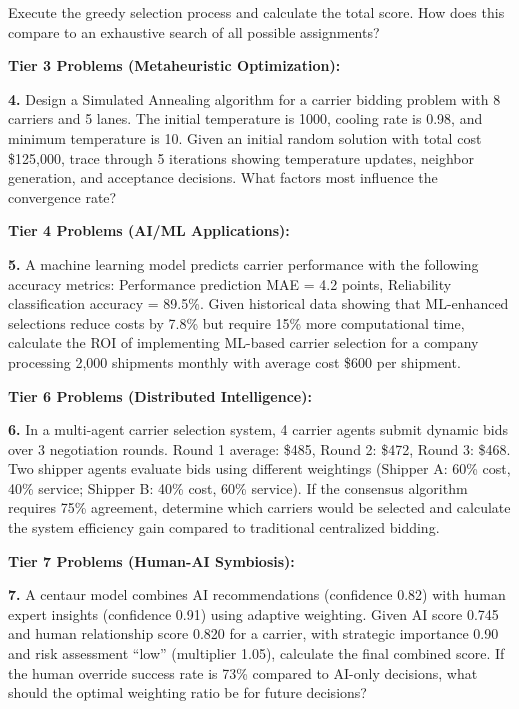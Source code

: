 \documentclass{article}
\begin{document}
Execute the greedy selection process and calculate the total score. How does this compare to an exhaustive search of all possible assignments?

\textbf{Tier 3 Problems (Metaheuristic Optimization):}

\textbf{4.} Design a Simulated Annealing algorithm for a carrier bidding problem with 8 carriers and 5 lanes. The initial temperature is 1000, cooling rate is 0.98, and minimum temperature is 10. Given an initial random solution with total cost \$125,000, trace through 5 iterations showing temperature updates, neighbor generation, and acceptance decisions. What factors most influence the convergence rate?

\textbf{Tier 4 Problems (AI/ML Applications):}

\textbf{5.} A machine learning model predicts carrier performance with the following accuracy metrics: Performance prediction MAE = 4.2 points, Reliability classification accuracy = 89.5\%. Given historical data showing that ML-enhanced selections reduce costs by 7.8\% but require 15\% more computational time, calculate the ROI of implementing ML-based carrier selection for a company processing 2,000 shipments monthly with average cost \$600 per shipment.

\textbf{Tier 6 Problems (Distributed Intelligence):}

\textbf{6.} In a multi-agent carrier selection system, 4 carrier agents submit dynamic bids over 3 negotiation rounds. Round 1 average: \$485, Round 2: \$472, Round 3: \$468. Two shipper agents evaluate bids using different weightings (Shipper A: 60\% cost, 40\% service; Shipper B: 40\% cost, 60\% service). If the consensus algorithm requires 75\% agreement, determine which carriers would be selected and calculate the system efficiency gain compared to traditional centralized bidding.

\textbf{Tier 7 Problems (Human-AI Symbiosis):}

\textbf{7.} A centaur model combines AI recommendations (confidence 0.82) with human expert insights (confidence 0.91) using adaptive weighting. Given AI score 0.745 and human relationship score 0.820 for a carrier, with strategic importance 0.90 and risk assessment ``low'' (multiplier 1.05), calculate the final combined score. If the human override success rate is 73\% compared to AI-only decisions, what should the optimal weighting ratio be for future decisions?
\end{document}
